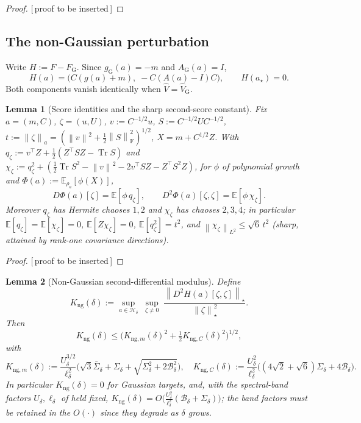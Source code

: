 \documentclass[11pt]{article}
\theoremstyle{plain}
\newtheorem{lemma}[lemma]{Lemma}
\theoremstyle{definition}
\theoremstyle{remark}
\newcommand{\E}{\mathbb{E}}
\newcommand{\Tr}{\operatorname{Tr}}
\newcommand{\Id}{I}
\newcommand{\Frob}{\mathrm{F}}
\newcommand{\norm}[1]{\left\lVert #1\right\rVert}
\newcommand{\Hreg}{\mathcal{H}}
\newcommand{\FGauss}{F_{\mathrm G}}
\newcommand{\Kng}{K_{\mathrm{ng}}}
\newcommand{\PROOFHOLE}{{\color{red}\textsf{[\,proof to be inserted\,]}}}
\begin{document}
\begin{proof}
\PROOFHOLE
\end{proof}

\subsection{The non-Gaussian perturbation}

Write $H:=F-\FGauss$. Since $g_{\mathrm G}(a)=-m$ and $A_{\mathrm G}(a)=\Id$,
\begin{equation}
\label{eq:H-def}
    H(a)=\bigl(C(g(a)+m),\;-C(A(a)-\Id)C\bigr),\qquad H(a_\star)=0 .
\end{equation}
Both components vanish identically when $\widehat V=\widehat V_{\mathrm G}$.

\begin{lemma}[Score identities and the sharp second-score constant]
\label{lem:second-score}
Fix $a=(m,C)$, $\zeta=(u,U)$, $v:=C^{-1/2}u$, $S:=C^{-1/2}UC^{-1/2}$,
$t:=\norm\zeta_a=(\norm v^2+\tfrac12\norm S_{\Frob}^2)^{1/2}$, $X=m+C^{1/2}Z$. With
$q_\zeta:=v^\top Z+\tfrac12(Z^\top SZ-\Tr S)$ and
$\chi_\zeta:=q_\zeta^2+(\tfrac12\Tr S^2-\norm v^2-2v^\top SZ-Z^\top S^2Z)$, for $\phi$ of polynomial
growth and $\Phi(a):=\E_{\rho_a}[\phi(X)]$,
\[
    D\Phi(a)[\zeta]=\E[\phi\,q_\zeta],
    \qquad
    D^2\Phi(a)[\zeta,\zeta]=\E[\phi\,\chi_\zeta].
\]
Moreover $q_\zeta$ has Hermite chaoses $1,2$ and $\chi_\zeta$ has chaoses $2,3,4$; in particular
$\E[q_\zeta]=\E[\chi_\zeta]=0$, $\E[Z\chi_\zeta]=0$, $\E[q_\zeta^2]=t^2$, and
$\norm{\chi_\zeta}_{L^2}\leq\sqrt6\,t^2$ (sharp, attained by rank-one covariance directions).
\end{lemma}

\begin{proof}
\PROOFHOLE
\end{proof}

\begin{lemma}[Non-Gaussian second-differential modulus]
\label{lem:Kng}
Define
\[
    \Kng(\delta):=\sup_{a\in\Hreg_\delta}\;\sup_{\zeta\neq0}\;\frac{\norm{D^2H(a)[\zeta,\zeta]}_\star}{\norm\zeta_\star^2}.
\]
Then
\[
    \Kng(\delta)\leq\bigl(K_{\mathrm{ng},m}(\delta)^2+\tfrac12K_{\mathrm{ng},C}(\delta)^2\bigr)^{1/2},
\]
with
\[
    K_{\mathrm{ng},m}(\delta):=\frac{U_\delta^{3/2}}{\ell_\delta^2}\bigl(\sqrt3\bar\Sigma_\delta+\Sigma_\delta+\sqrt{\Sigma_\delta^2+2\mathcal B_\delta^2}\bigr),
    \quad
    K_{\mathrm{ng},C}(\delta):=\frac{U_\delta^2}{\ell_\delta^2}\bigl((4\sqrt2+\sqrt6)\Sigma_\delta+4\mathcal B_\delta\bigr).
\]
In particular $\Kng(\delta)=0$ for Gaussian targets, and, with the spectral-band factors
$U_\delta,\ell_\delta$ of  held fixed,
$\Kng(\delta)=O\!\bigl(\tfrac{U_\delta^2}{\ell_\delta^2}(\mathcal B_\delta+\Sigma_\delta)\bigr)$; the
band factors must be retained in the $O(\cdot)$ since they degrade as $\delta$ grows.
\end{lemma}
\end{document}
